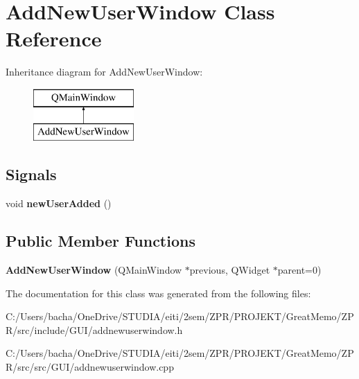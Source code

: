 \hypertarget{class_add_new_user_window}{}\section{Add\+New\+User\+Window Class Reference}
\label{class_add_new_user_window}
Inheritance diagram for Add\+New\+User\+Window\+:\begin{figure}[H]
\begin{center}
\leavevmode
\includegraphics[height=2.000000cm]{class_add_new_user_window}
\end{center}
\end{figure}
\subsection*{Signals}
\begin{DoxyCompactItemize}
\item 
\mbox{\label{class_add_new_user_window_ac11ebe81036c87ca8b8e3c64f4d7161c}} 
void {\bfseries new\+User\+Added} ()
\end{DoxyCompactItemize}
\subsection*{Public Member Functions}
\begin{DoxyCompactItemize}
\item 
\mbox{\label{class_add_new_user_window_accde784349063aa539429633496b1d3b}} 
{\bfseries Add\+New\+User\+Window} (Q\+Main\+Window $\ast$previous, Q\+Widget $\ast$parent=0)
\end{DoxyCompactItemize}


The documentation for this class was generated from the following files\+:\begin{DoxyCompactItemize}
\item 
C\+:/\+Users/bacha/\+One\+Drive/\+S\+T\+U\+D\+I\+A/eiti/2sem/\+Z\+P\+R/\+P\+R\+O\+J\+E\+K\+T/\+Great\+Memo/\+Z\+P\+R/src/include/\+G\+U\+I/addnewuserwindow.\+h\item 
C\+:/\+Users/bacha/\+One\+Drive/\+S\+T\+U\+D\+I\+A/eiti/2sem/\+Z\+P\+R/\+P\+R\+O\+J\+E\+K\+T/\+Great\+Memo/\+Z\+P\+R/src/src/\+G\+U\+I/addnewuserwindow.\+cpp\end{DoxyCompactItemize}

